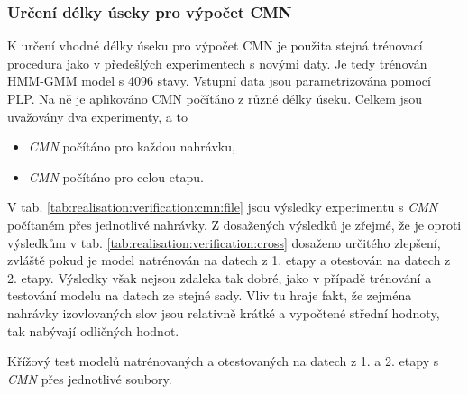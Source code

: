 \subsubsection{Určení délky úseky pro výpočet CMN}

K určení vhodné délky úseku pro výpočet CMN je použita stejná trénovací procedura jako v předešlých experimentech s novými daty. Je tedy trénován HMM-GMM model s 4096 stavy. Vstupní data jsou parametrizována pomocí PLP. Na ně je aplikováno CMN počítáno z různé délky úseku. Celkem jsou uvažovány dva experimenty, a to

\begin{itemize}
  \item \textit{CMN} počítáno pro každou nahrávku,
  \item \textit{CMN} počítáno pro celou etapu.
\end{itemize}

V tab. \ref{tab:realisation:verification:cmn:file} jsou výsledky experimentu s \textit{CMN} počítaném přes jednotlivé nahrávky. Z dosažených výsledků je zřejmé, že je oproti výsledkům v tab. \ref{tab:realisation:verification:cross} dosaženo určitého zlepšení, zvláště pokud je model natrénován na datech z 1. etapy a otestován na datech z 2. etapy. Výsledky však nejsou zdaleka tak dobré, jako v případě trénování a testování modelu na datech ze stejné sady. Vliv tu hraje fakt, že zejména nahrávky izovlovaných slov jsou relativně krátké a vypočtené střední hodnoty, tak nabývají odličných hodnot.

\begin{table}[htpb]
  \centering
  \def\arraystretch{1.5}
  \caption{Křížový test modelů natrénovaných a otestovaných na datech z 1. a 2. etapy s \textit{CMN}  přes jednotlivé soubory.}
  \label{tab:realisation:verification:cmn:file}
\end{table}

